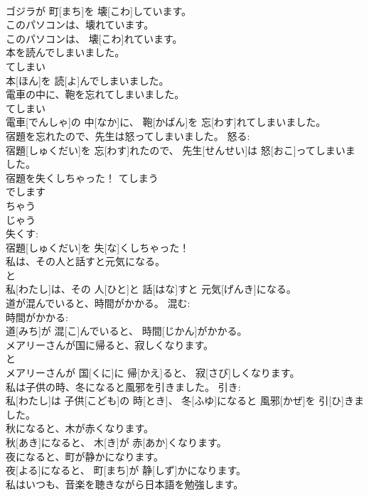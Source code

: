 \documentclass[8pt]{extreport}
\begin{document}
\begin{CJK}{UTF8}{min}
\\	ゴジラが 町[まち]を 壊[こわ]しています。	
\\	このパソコンは、壊れています。	
\\	このパソコンは、 壊[こわ]れています。	
\\	本を読んでしまいました。	
\\	てしまい 
\\	本[ほん]を 読[よ]んでしまいました。	
\\	電車の中に、鞄を忘れてしまいました。	
\\	てしまい 
\\	電車[でんしゃ]の 中[なか]に、 鞄[かばん]を 忘[わす]れてしまいました。	
\\	宿題を忘れたので、先生は怒ってしまいました。	怒る: 
\\	宿題[しゅくだい]を 忘[わす]れたので、 先生[せんせい]は 怒[おこ]ってしまいました。	
\\	宿題を失くしちゃった！	てしまう 
\\	でします 
\\	ちゃう 
\\	じゃう 
\\	失くす: 
\\	宿題[しゅくだい]を 失[な]くしちゃった！	
\\	私は、その人と話すと元気になる。	
\\	と 
\\	私[わたし]は、その 人[ひと]と 話[はな]すと 元気[げんき]になる。	
\\	道が混んでいると、時間がかかる。	混む: 
\\	時間がかかる: 
\\	道[みち]が 混[こ]んでいると、 時間[じかん]がかかる。	
\\	メアリーさんが国に帰ると、寂しくなります。	
\\	と 
\\	メアリーさんが 国[くに]に 帰[かえ]ると、 寂[さび]しくなります。	
\\	私は子供の時、冬になると風邪を引きました。	引き: 
\\	私[わたし]は 子供[こども]の 時[とき]、 冬[ふゆ]になると 風邪[かぜ]を 引[ひ]きました。	
\\	秋になると、木が赤くなります。	
\\	秋[あき]になると、 木[き]が 赤[あか]くなります。	
\\	夜になると、町が静かになります。	
\\	夜[よる]になると、 町[まち]が 静[しず]かになります。	
\\	私はいつも、音楽を聴きながら日本語を勉強します。	

\end{CJK}
\end{document}
